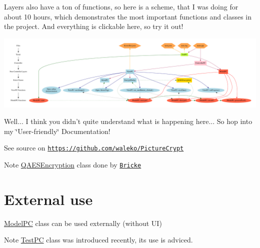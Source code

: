 Layers also have a ton of functions, so here is a scheme, that I was doing for about 10 hours, which demonstrates the most important functions and classes in the project. And everything is clickable here, so try it out! 
\begin{DoxyImageNoCaption}
  \mbox{\includegraphics[width=\textwidth,height=\textheight/2,keepaspectratio=true]{dot_mainpage}}
\end{DoxyImageNoCaption}
 Well... I think you didn't quite understand what is happening here... So hop into my \char`\"{}\-User-\/friendly\char`\"{} Documentation!

See source on \href{https://github.com/waleko/PictureCrypt}{\tt https\-://github.\-com/waleko/\-Picture\-Crypt}

\begin{DoxyNote}{Note}
\hyperlink{class_q_a_e_s_encryption}{Q\-A\-E\-S\-Encryption} class done by \href{https://github.com/bricke}{\tt Bricke}
\end{DoxyNote}
\hypertarget{index_ext-use}{}\section{External use}\label{index_ext-use}
\hyperlink{class_model_p_c}{Model\-P\-C} class can be used externally (without U\-I) \begin{DoxyNote}{Note}
\hyperlink{class_test_p_c}{Test\-P\-C} class was introduced recently, its use is adviced.
\end{DoxyNote}

